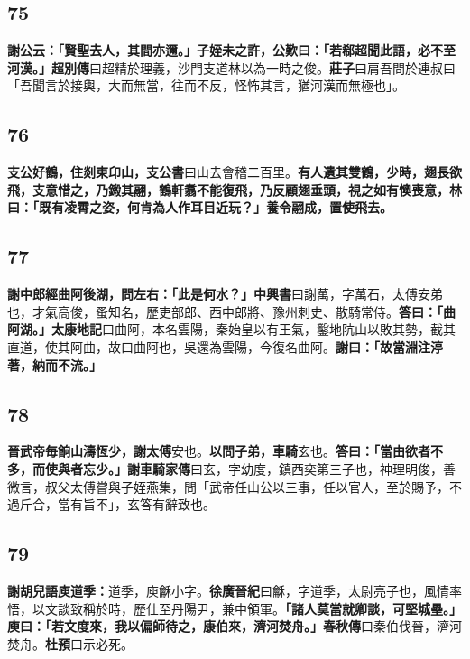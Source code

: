 \subsection*{75}

\textbf{謝公云：「賢聖去人，其間亦邇。」子姪未之許，公歎曰：「若郗超聞此語，必不至河漢。」}{\footnotesize \textbf{超別傳}曰超精於理義，沙門支道林以為一時之俊。\textbf{莊子}曰肩吾問於連叔曰「吾聞言於接輿，大而無當，往而不反，怪怖其言，猶河漢而無極也」。}

\subsection*{76}

\textbf{支公好鶴，住剡東卬山，}{\footnotesize \textbf{支公書}曰山去會稽二百里。}\textbf{有人遺其雙鶴，少時，翅長欲飛，支意惜之，乃鎩其翮，鶴軒翥不能復飛，乃反顧翅垂頭，視之如有懊喪意，林曰：「既有凌霄之姿，何肯為人作耳目近玩？」養令翮成，置使飛去。}

\subsection*{77}

\textbf{謝中郎經曲阿後湖，問左右：「此是何水？」}{\footnotesize \textbf{中興書}曰謝萬，字萬石，太傅安弟也，才氣高俊，蚤知名，歷吏部郎、西中郎將、豫州刺史、散騎常侍。}\textbf{答曰：「曲阿湖。」}{\footnotesize \textbf{太康地記}曰曲阿，本名雲陽，秦始皇以有王氣，鑿地阬山以敗其勢，截其直道，使其阿曲，故曰曲阿也，吳還為雲陽，今復名曲阿。}\textbf{謝曰：「故當淵注渟著，納而不流。」}

\subsection*{78}

\textbf{晉武帝毎餉山濤恆少，謝太傅}{\footnotesize 安也。}\textbf{以問子弟，車騎}{\footnotesize 玄也。}\textbf{答曰：「當由欲者不多，而使與者忘少。」}{\footnotesize \textbf{謝車騎家傳}曰玄，字幼度，鎮西奕第三子也，神理明俊，善微言，叔父太傅嘗與子姪燕集，問「武帝任山公以三事，任以官人，至於賜予，不過斤合，當有旨不」，玄答有辭致也。}

\subsection*{79}

\textbf{謝胡兒語庾道季：}{\footnotesize 道季，庾龢小字。\textbf{徐廣晉紀}曰龢，字道季，太尉亮子也，風情率悟，以文談致稱於時，歷仕至丹陽尹，兼中領軍。}\textbf{「諸人莫當就卿談，可堅城壘。」庾曰：「若文度來，我以偏師待之，康伯來，濟河焚舟。」}{\footnotesize \textbf{春秋傳}曰秦伯伐晉，濟河焚舟。\textbf{杜預}曰示必死。}

